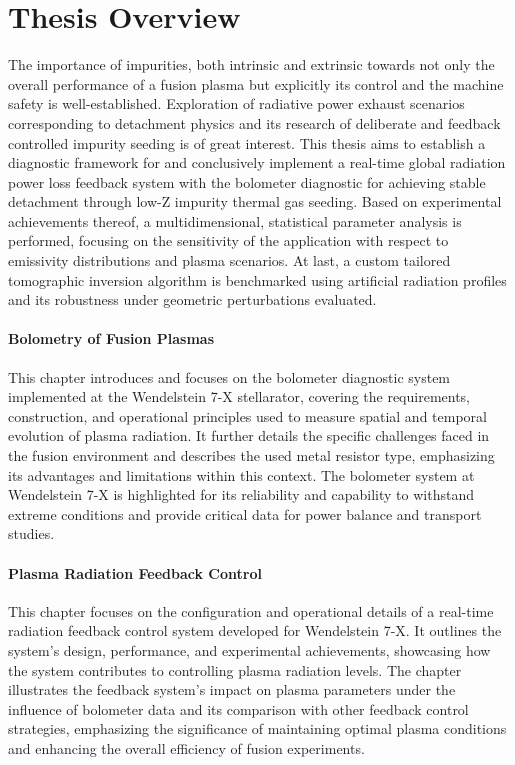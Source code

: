 %
\checkoddpage\ifoddpage\clearpage\else\cleardoublepage\fi%
%
\section*{Thesis Overview}%
%
    The importance of impurities, both intrinsic and extrinsic towards not only the overall performance of a fusion plasma but explicitly its control and the machine safety is well-established. Exploration of radiative power exhaust scenarios corresponding to detachment physics and its research of deliberate and feedback controlled impurity seeding is of great interest. This thesis aims to establish a diagnostic framework for and conclusively implement a real-time global radiation power loss feedback system with the bolometer diagnostic for achieving stable detachment through low-Z impurity thermal gas seeding. Based on experimental achievements thereof, a multidimensional, statistical parameter analysis is performed, focusing on the sensitivity of the application with respect to emissivity distributions and plasma scenarios. At last, a custom tailored tomographic inversion algorithm is benchmarked using artificial radiation profiles and its robustness under geometric perturbations evaluated.%
%
    \paragraph*{Bolometry of Fusion Plasmas}%
%
       This chapter introduces and focuses on the bolometer diagnostic system implemented at the Wendelstein 7-X stellarator, covering the requirements, construction, and operational principles used to measure spatial and temporal evolution of plasma radiation. It further details the specific challenges faced in the fusion environment and describes the used metal resistor type, emphasizing its advantages and limitations within this context. The bolometer system at Wendelstein 7-X is highlighted for its reliability and capability to withstand extreme conditions and provide critical data for power balance and transport studies.%
%
    \paragraph*{Plasma Radiation Feedback Control}%
%
        This chapter focuses on the configuration and operational details of a real-time radiation feedback control system developed for Wendelstein 7-X. It outlines the system's design, performance, and experimental achievements, showcasing how the system contributes to controlling plasma radiation levels. The chapter illustrates the feedback system's impact on plasma parameters under the influence of bolometer data and its comparison with other feedback control strategies, emphasizing the significance of maintaining optimal plasma conditions and enhancing the overall efficiency of fusion experiments.%
%
